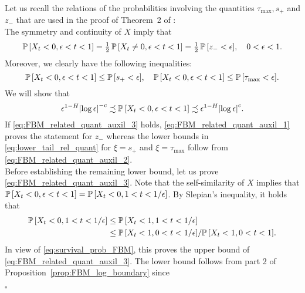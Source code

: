 \documentclass[11pt]{article}
\theoremstyle{plain}
\theoremstyle{definition}
\renewenvironment{proof}[1][] {\smallskip \noindent {\bf Proof#1.} }{\hspace*{\fill}$\square$\medskip\par}
\begin{document}
\begin{proof}
Let us recall the relations of the probabilities involving the quantities $\tau_{\max},s_+$ and $z_-$ that are used in the proof of Theorem~2 of \cite{molchan:1999a}:\\
The symmetry and continuity of $X$ imply that
\begin{equation}\label{eq:FBM_related_quant_auxil_1}
  {{{\bf {\mathbb{P}}}}\left[{X_t < 0, \epsilon < t < 1}\right]} = \tfrac{1}{2} \, {{{\bf {\mathbb{P}}}}\left[{X_t \neq 0, \epsilon < t < 1}\right]} = \tfrac{1}{2} \, {{{\bf {\mathbb{P}}}}\left[{z_- < \epsilon}\right]}, \quad 0 < \epsilon <1.
\end{equation}
   Moreover, we clearly have the following inequalities:
\begin{equation}\label{eq:FBM_related_quant_auxil_2}
   {{{\bf {\mathbb{P}}}}\left[{X_t < 0, \epsilon < t < 1}\right]} \le {{{\bf {\mathbb{P}}}}\left[{s_+ < \epsilon}\right]}, \quad {{{\bf {\mathbb{P}}}}\left[{X_t < 0, \epsilon < t < 1}\right]} \le {{{\bf {\mathbb{P}}}}\left[{\tau_{\max} < \epsilon}\right]}.
\end{equation}
We will show that 
\begin{equation}\label{eq:FBM_related_quant_auxil_3}
  \epsilon^{1-H} {\lvert{\log \epsilon}\rvert}^{-c} \precsim {{{\bf {\mathbb{P}}}}\left[{X_t < 0, \epsilon < t < 1}\right]} \precsim \epsilon^{1-H} {\lvert{\log \epsilon}\rvert}^{c}.
\end{equation}
If \eqref{eq:FBM_related_quant_auxil_3} holds, \eqref{eq:FBM_related_quant_auxil_1} proves the statement for $z_-$ whereas the lower bounds in \eqref{eq:lower_tail_rel_quant} for $\xi = s_+$ and $\xi = \tau_{\max}$ follow from \eqref{eq:FBM_related_quant_auxil_2}. \\
Before establishing the remaining lower bound, let us prove \eqref{eq:FBM_related_quant_auxil_3}. Note that the self-similarity of $X$ implies that ${{{\bf {\mathbb{P}}}}\left[{X_t < 0, \epsilon < t < 1}\right]} = {{{\bf {\mathbb{P}}}}\left[{X_t < 0, 1 < t < 1/\epsilon}\right]}$. By Slepian's inequality, it holds that
\begin{align*}
   {{{\bf {\mathbb{P}}}}\left[{X_t < 0, 1 < t < 1/\epsilon}\right]} &\le {{{\bf {\mathbb{P}}}}\left[{X_t < 1, 1 < t < 1/\epsilon}\right]} \\
&\le {{{\bf {\mathbb{P}}}}\left[{X_t < 1, 0 < t < 1/\epsilon}\right]}/ {{{\bf {\mathbb{P}}}}\left[{X_t < 1, 0 < t < 1}\right]}.
\end{align*}
In view of \eqref{eq:survival_prob_FBM}, this proves the upper bound of \eqref{eq:FBM_related_quant_auxil_3}. The lower bound follows from part 2 of Proposition~\ref{prop:FBM_log_boundary} since

\end{proof}
\end{document}
